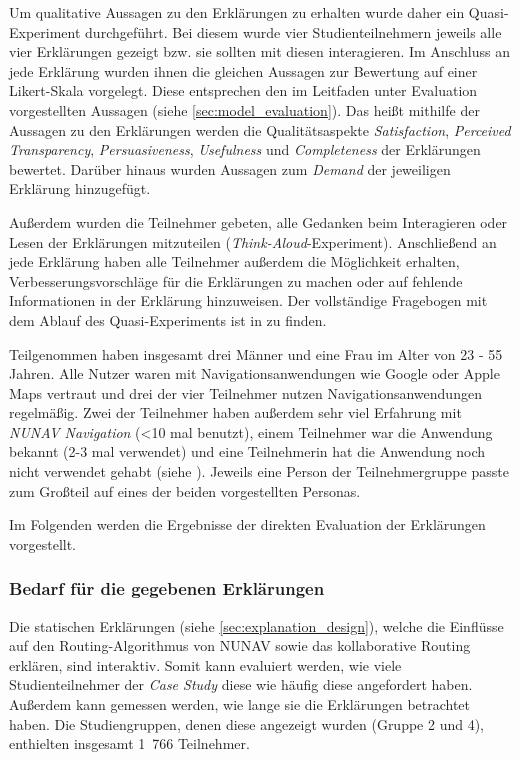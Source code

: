 Um qualitative Aussagen zu den Erklärungen zu erhalten wurde daher ein Quasi-Experiment durchgeführt. Bei diesem wurde vier Studienteilnehmern jeweils alle vier Erklärungen gezeigt bzw. sie sollten mit diesen interagieren. Im Anschluss an jede Erklärung wurden ihnen die gleichen Aussagen zur Bewertung auf einer Likert-Skala vorgelegt. Diese entsprechen den im Leitfaden unter Evaluation vorgestellten Aussagen (siehe \autoref{sec:model_evaluation}). Das heißt mithilfe der Aussagen zu den Erklärungen werden die Qualitätsaspekte \textit{Satisfaction}, \textit{Perceived Transparency}, \textit{Persuasiveness}, \textit{Usefulness} und \textit{Completeness} der Erklärungen bewertet. Darüber hinaus wurden Aussagen zum \textit{Demand} der jeweiligen Erklärung hinzugefügt.

Außerdem wurden die Teilnehmer gebeten, alle Gedanken beim Interagieren oder Lesen der Erklärungen mitzuteilen (\textit{Think-Aloud}-Experiment). Anschließend an jede Erklärung haben alle Teilnehmer außerdem die Möglichkeit erhalten, Verbesserungsvorschläge für die Erklärungen zu machen oder auf fehlende Informationen in der Erklärung hinzuweisen. Der vollständige Fragebogen mit dem Ablauf des Quasi-Experiments ist in  zu finden.

Teilgenommen haben insgesamt drei Männer und eine Frau im Alter von 23 - 55 Jahren. Alle Nutzer waren mit Navigationsanwendungen wie Google oder Apple Maps vertraut und drei der vier Teilnehmer nutzen Navigationsanwendungen regelmäßig. Zwei der Teilnehmer haben außerdem sehr viel Erfahrung mit \textit{NUNAV Navigation} (<10 mal benutzt), einem Teilnehmer war die Anwendung bekannt (2-3 mal verwendet) und eine Teilnehmerin hat die Anwendung noch nicht verwendet gehabt (siehe ). Jeweils eine Person der Teilnehmergruppe passte zum Großteil auf eines der beiden vorgestellten Personas.

Im Folgenden werden die Ergebnisse der direkten Evaluation der Erklärungen vorgestellt.

\subsubsection{Bedarf für die gegebenen Erklärungen}
\label{sec:demand_qualitative_evaluation}

Die statischen Erklärungen (siehe \autoref{sec:explanation_design}), welche die Einflüsse auf den Routing-Algorithmus von NUNAV sowie das kollaborative Routing erklären, sind interaktiv. Somit kann evaluiert werden, wie viele Studienteilnehmer der \textit{Case Study} diese wie häufig diese angefordert haben. Außerdem kann gemessen werden, wie lange sie die Erklärungen betrachtet haben. Die Studiengruppen, denen diese angezeigt wurden (Gruppe 2 und 4), enthielten insgesamt 1~766 Teilnehmer.

